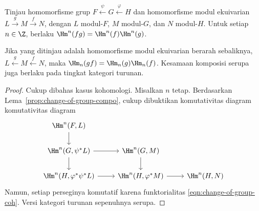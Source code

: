 \begin{proposition}
\label{prop:change-of-group-composite}
	Tinjau homomorfisme grup
	$F\xleftarrow{\psi}G\xleftarrow{\varphi}H$ dan homomorfisme modul
	ekuivarian $L\xrightarrow{g}M\xrightarrow{f}N$, dengan $L$ modul-$F$,
	$M$ modul-$G$, dan $N$ modul-$H$. Untuk setiap $n\in\Z$, berlaku
	$\Hm^n(fg)=\Hm^n(f)\Hm^n(g)$.

	Jika yang ditinjau adalah homomorfisme modul ekuivarian berarah sebaliknya,
	$L\xleftarrow{g}M\xleftarrow{f}N$, maka
	$\Hm_n(gf)=\Hm_n(g)\Hm_n(f)$. Kesamaan komposisi serupa juga berlaku pada
	tingkat kategori turunan.
\end{proposition}
\begin{proof}
	Cukup dibahas kasus kohomologi. Misalkan $n$ tetap. Berdasarkan
	Lema~\ref{prop:change-of-group-compo}, cukup dibuktikan komutativitas diagram
	komutativitas diagram
	\[\begin{tikzcd}
		\Hm^n(F, L) \arrow[d] & & \\
		\Hm^n(G, \psi^* L) \arrow[r] \arrow[d] & \Hm^n(G, M) \arrow[d] & \\
		\Hm^n(H, \varphi^* \psi^* L) \arrow[r] & \Hm^n(H, \varphi^* M) \arrow[r] & \Hm^n(H, N)
	\end{tikzcd}\]
	Namun, setiap perseginya komutatif karena funktorialitas
\eqref{eqn:change-of-group-coh}. Versi kategori turunan sepenuhnya serupa.
\end{proof}

